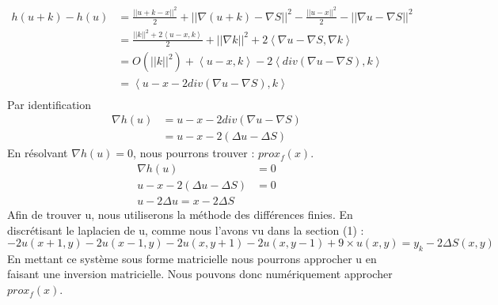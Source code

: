 \begin{equation*}
\begin{aligned}
h(u+k) -h(u) &= \frac{||u+k-x||^2}{2}+||\nabla  (u+k) -\nabla S ||^2- \frac{||u-x||^2}{2}-||\nabla u -\nabla S ||^2\\
& = \frac{||k||^2+2\left<u-x,k\right>}{2}+||\nabla k||^2+2\left<\nabla u-\nabla S, \nabla k\right>\\
& = O(||k||^2)+\left<u-x,k\right>-2\left<div(\nabla u-\nabla S), k\right>\\
& = \left<u-x-2div(\nabla u-\nabla S), k\right>\\
\end{aligned}
\end{equation*}
Par identification 
\begin{equation*}
\begin{aligned}
\nabla h(u) &= u-x-2div(\nabla u - \nabla S)\\
& = u-x-2(\Delta u -\Delta S)
\end{aligned}
\end{equation*}
En résolvant $\nabla h(u) = 0$, nous pourrons trouver  : $prox_f(x) $. \\	
	\begin{equation*}
		\begin{aligned}
		\nabla h(u) &= 0\\
		u-x-2(\Delta u -\Delta S) & =0\\
		u-2\Delta u = x-2\Delta S
		\end{aligned}
\end{equation*}
Afin de trouver u, nous utiliserons la méthode des différences finies. En discrétisant le laplacien de u, comme nous l'avons vu dans la section (1) : 
\begin{equation*}
 -2u(x+1,y) -2 u(x-1,y)-2u(x,y+1) -2 u(x,y-1) +9\times u(x,y) =  y_k-  2\Delta S(x,y)
\end{equation*}
En mettant ce système sous forme matricielle nous pourrons approcher u en faisant une inversion matricielle. 
Nous pouvons donc numériquement approcher $prox_f(x)$.

